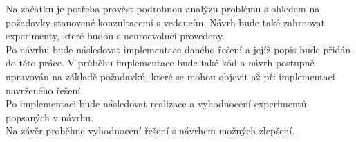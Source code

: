 Na začátku je potřeba provést podrobnou analýzu problému s ohledem na požadavky stanovené konzultacemi s vedoucím. Návrh bude také zahrnovat experimenty, které budou s neuroevolucí provedeny. \\
Po návrhu bude následovat implementace daného řešení a jejíž popis bude přidán do této práce. V průběhu implementace bude také kód a návrh postupně upravován na základě požadavků, které se mohou objevit až při implementaci navrženého řešení. \\
Po implementaci bude následovat realizace a vyhodnocení experimentů popsaných v návrhu. \\
Na závěr proběhne vyhodnocení řešení s návrhem možných zlepšení.